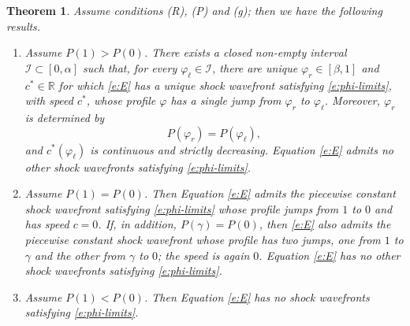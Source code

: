 \documentclass[11pt,a4paper]{article}
\newtheorem{theorem}{Theorem}[section]
\begin{document}
\begin{theorem}
\label{t:main}
Assume conditions {\rm (R)}, {\rm (P)} and {\rm (g)}; then we have the following results.

\begin{enumerate}
\item[(1)]
Assume $P(1)>P(0)$.  There exists a closed non-empty interval $\mathcal I\subset [0,\alpha]$ such that, for every $\varphi_\ell \in \mathcal I$, there are unique $\varphi_r\in[\beta,1]$ and $c^*\in \mathbb R$ for which \eqref{e:E} has a unique shock wavefront satisfying \eqref{e:phi-limits}, with speed $c^*$, whose profile $\varphi$ has a single jump from $\varphi_r$ to $\varphi_\ell$. Moreover, $\varphi_r$ is determined by
\begin{equation}
\label{e:condition_P}
P(\varphi_r)=P(\varphi_\ell),
\end{equation}  
and $c^*(\varphi_\ell)$ is continuous and strictly decreasing. Equation \eqref{e:E} admits no other shock wavefronts satisfying \eqref{e:phi-limits}.

\item[(2)] Assume $P(1)=P(0)$. Then Equation \eqref{e:E} admits the piecewise constant shock wavefront satisfying \eqref{e:phi-limits} whose profile jumps from $1$ to $0$ and has speed $c=0$. If, in addition, $P(\gamma)=P(0)$, then \eqref{e:E} also admits the piecewise constant shock wavefront whose profile has two jumps, one from $1$ to $\gamma$ and the other from $\gamma$ to $0$; the speed is again $0$. 
Equation \eqref{e:E} has no other shock wavefronts satisfying \eqref{e:phi-limits}.

\item[(3)] Assume $P(1)<P(0)$. Then Equation \eqref{e:E} has no shock wavefronts satisfying \eqref{e:phi-limits}.
\end{enumerate}
\end{theorem}
\end{document}
